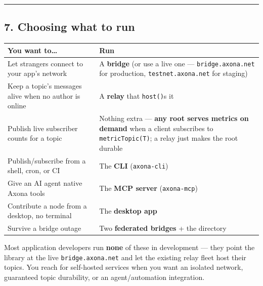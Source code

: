 \documentclass[
  nobib]{tufte-handout}
\newcounter{none} %
\begin{document}
\begin{center}\rule{0.5\linewidth}{0.5pt}\end{center}

\subsection{7. Choosing what to run}\label{choosing-what-to-run}

{\def\LTcaptype{none} %
\begin{longtable}[]{@{}
  >{\raggedright\arraybackslash}p{}
  >{\raggedright\arraybackslash}p{}@{}}
\toprule\noalign{}
\begin{minipage}[b]{\linewidth}\raggedright
You want to\ldots{}
\end{minipage} & \begin{minipage}[b]{\linewidth}\raggedright
Run
\end{minipage} \\
\midrule\noalign{}
\endhead
\bottomrule\noalign{}
\endlastfoot
Let strangers connect to your app's network & A \textbf{bridge} (or use
a live one --- \texttt{bridge.axona.net} for production,
\texttt{testnet.axona.net} for staging) \\
Keep a topic's messages alive when no author is online & A
\textbf{relay} that \texttt{host()}s it \\
Publish live subscriber counts for a topic & Nothing extra ---
\textbf{any root serves metrics on demand} when a client subscribes to
\texttt{metricTopic(T)}; a relay just makes the root durable \\
Publish/subscribe from a shell, cron, or CI & The \textbf{CLI}
(\texttt{axona-cli}) \\
Give an AI agent native Axona tools & The \textbf{MCP server}
(\texttt{axona-mcp}) \\
Contribute a node from a desktop, no terminal & The \textbf{desktop
app} \\
Survive a bridge outage & Two \textbf{federated bridges} + the
directory \\
\end{longtable}
}

Most application developers run \textbf{none} of these in development
--- they point the library at the live \texttt{bridge.axona.net} and let
the existing relay fleet host their topics. You reach for self-hosted
services when you want an isolated network, guaranteed topic durability,
or an agent/automation integration.
\end{document}
